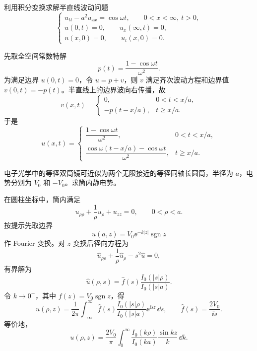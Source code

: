 \begin{question}
利用积分变换求解半直线波动问题
\[
\begin{cases}
u_{tt}-a^2u_{xx}=\cos\omega t,\qquad 0<x<\infty,\ t>0,\\
u(0,t)=0,\qquad u_x(\infty,t)=0,\\
u(x,0)=0,\qquad u_t(x,0)=0.
\end{cases}
\]
\begin{solution}
先取全空间常数特解
\[
p(t)=\frac{1-\cos\omega t}{\omega^2}.
\]
为满足边界 \(u(0,t)=0\)，令 \(u=p+v\)，则 \(v\) 满足齐次波动方程和边界值 \(v(0,t)=-p(t)\)。半直线上的边界波向右传播，故
\[
v(x,t)=
\begin{cases}
0,&0<t<x/a,\\
-p(t-x/a),&t\ge x/a.
\end{cases}
\]
于是
\[
u(x,t)=
\begin{cases}
\dfrac{1-\cos\omega t}{\omega^2},&0<t<x/a,\\[0.6em]
\dfrac{\cos\omega(t-x/a)-\cos\omega t}{\omega^2},&t\ge x/a.
\end{cases}
\]
\end{solution}
\end{question}

\begin{question}
电子光学中的等径双筒镜可近似为两个无限接近的等径同轴长圆筒，半径为 \(a\)，电势分别为 \(V_0\) 和 \(-V_0\)。求筒内静电势。

\begin{solution}
在圆柱坐标中，筒内满足
\[
u_{\rho\rho}+\frac1\rho u_\rho+u_{zz}=0,\qquad 0<\rho<a.
\]
按提示先取边界
\[
u(a,z)=V_0\ee^{-k|z|}\operatorname{sgn}z
\]
作 Fourier 变换。对 \(z\) 变换后径向方程为
\[
\hat u_{\rho\rho}+\frac1\rho\hat u_\rho-s^2\hat u=0,
\]
有界解为
\[
\hat u(\rho,s)=\hat f(s)\frac{I_0(|s|\rho)}{I_0(|s|a)}.
\]
令 \(k\to0^+\)，其中 \(f(z)=V_0\operatorname{sgn}z\)，得
\[
u(\rho,z)=\frac1{2\pi}\int_{-\infty}^{\infty}
\hat f(s)\frac{I_0(|s|\rho)}{I_0(|s|a)}\ee^{\ii sz}\,\dd{s},
\qquad
\hat f(s)=\frac{2V_0}{\ii s}.
\]
等价地，
\[
u(\rho,z)=\frac{2V_0}{\pi}\int_0^\infty
\frac{I_0(k\rho)}{I_0(ka)}\frac{\sin kz}{k}\,\dd{k}.
\]
\end{solution}
\end{question}

